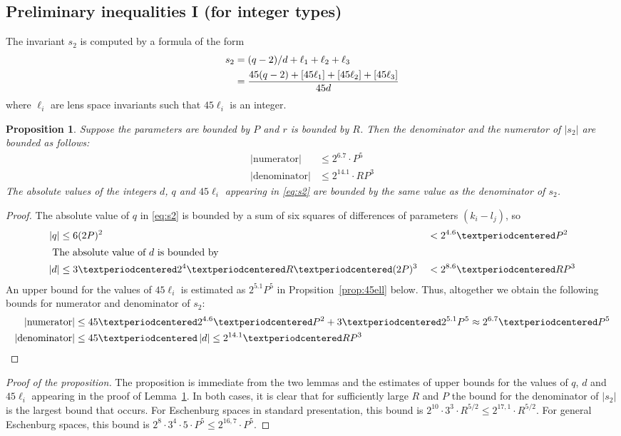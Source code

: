 \documentclass{article}
\newtheorem{prop}{Proposition}
\newcommand{\abs}[1]{\left|#1\right|}
\begin{document}
\subsection*{Preliminary inequalities I (for integer types)}
The invariant \(s_2\) is computed by a formula of the form
\begin{align}\label{eq:s2}
  \notag  s_2   &= (q-2)/d + \ell_1 + \ell_2 + \ell_3\\
                &= \frac{45(q-2) + [45\ell_1] + [45\ell_2] + [45\ell_3]}{45d}
\end{align}  
where \(\ell_i\) are lens space invariants such that \(45\ell_i\) is an integer.  

\begin{prop}\label{prop:s2-integers}
  Suppose the parameters are bounded by \(P\) and \(r\) is bounded by \(R\).  Then the denominator and the numerator of \(\abs{s_2}\) are bounded as follows:
  \begin{align*}
    \abs{\text{numerator}}   &\leq 2^{6.7}·P^5\\
    \abs{\text{denominator}} &\leq 2^{14.1}· RP^3
  \end{align*}
  The absolute values of the integers \(d\), \(q\) and \(45\ell_i\) appearing in \eqref{eq:s2} are bounded by the same value as the denominator of \(s_2\).
\end{prop}
 
\begin{proof}
The absolute value of \(q\) in \eqref{eq:s2} is bounded by a sum of six squares of differences of parameters \((k_i-l_j)\), so 
\begin{alignat}{7}
  \abs{q}&\leq 6(2P)^2 &&< 2^{4.6}·P^2\\
  \intertext{
  The absolute value of \(d\) is bounded by}
  \notag 
  \abs{d} &\leq 3 · 2^4 · R · (2P)^3 &&< 2^{8.6} · RP^3
\end{alignat}
An upper bound for the values of  \(45\ell_i\) is estimated as \(2^{5.1}P^5\) in  Propsition~\ref{prop:45ell} below. 
Thus, altogether we obtain the following bounds for numerator and denominator of \(s_2\):
\begin{align*}
  \abs{\text{numerator}} &\leq 45·2^{4.6}·P^2 + 3·2^{5.1}P^5 \approx 2^{6.7}·P^5\\
  \abs{\text{denominator}} &\leq 45·\abs{d} \leq 2^{14.1}· R P^3\qedhere
\end{align*}
\end{proof}

\begin{proof}[Proof of the proposition]
The proposition is immediate from the two lemmas and the estimates of upper bounds for the values of \(q\), \(d\) and \(45\ell_i\) appearing in the proof of Lemma~\ref{prop:s2-integers}.  In both cases, it is clear that for sufficiently large \(R\) and \(P\) the bound for the denominator of \(\abs{s_2}\) is the largest bound that occurs.  For Eschenburg spaces in standard presentation, this bound is 
\(
2^{10}·3^3·R^{5/2} \leq 2^{17,1}·R^{5/2}.
\)
For general Eschenburg spaces, this bound is
\(
    2^{8}·3^4·5·P^{5} \leq 2^{16,7}·P^5
\).
\end{proof}
\end{document}
